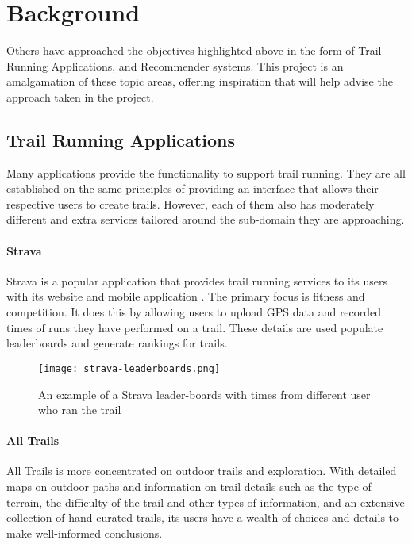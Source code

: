 \chapter{Background}
Others have approached the objectives highlighted above in the form of Trail Running Applications, and Recommender systems. This project is an amalgamation of these topic areas, offering inspiration that will help advise the approach taken in the project.

\section{Trail Running Applications} \label{sec:TrailRunningApplications}
Many applications provide the functionality to support trail running. They are all established on the same principles of providing an interface that allows their respective users to create trails. However, each of them also has moderately different and extra services tailored around the sub-domain they are approaching.

\subsubsection{Strava}
Strava is a popular application that provides trail running services to its users with its website and mobile application \cite{strava}.  The primary focus is fitness and competition.  It does this by allowing users to upload GPS data and recorded times of runs they have performed on a trail.  These details are used populate leaderboards and generate rankings for trails.

\begin{figure}[ht]
    \centering
    \texttt{[image: strava-leaderboards.png]}
    \caption{An example of a Strava leader-boards with times from different user who ran the trail}
    \label{fig:stravaLeaderboards}
\end{figure}

\subsubsection{All Trails}
All Trails \cite{alltrails} is more concentrated on outdoor trails and exploration.  With detailed maps on outdoor paths and information on trail details such as the type of terrain, the difficulty of the trail and other types of information, and an extensive collection of hand-curated trails, its users have a wealth of choices and details to make well-informed conclusions.

